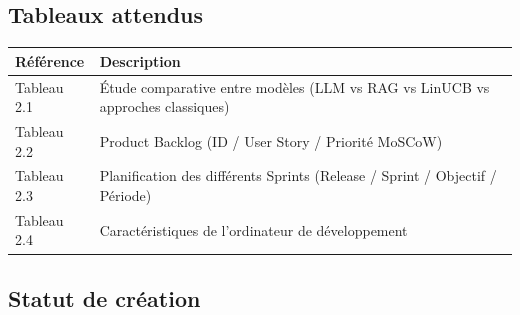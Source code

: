 \documentclass[12pt,a4paper]{article}
\begin{document}
\subsection*{Tableaux attendus}

\begin{longtable}{p{2cm} p{12cm}}
    \textbf{Référence} & \textbf{Description} \\
    \midrule
    \endhead
    
    Tableau 2.1 & Étude comparative entre modèles (LLM vs RAG vs LinUCB vs approches classiques) \\
    Tableau 2.2 & Product Backlog (ID / User Story / Priorité MoSCoW) \\
    Tableau 2.3 & Planification des différents Sprints (Release / Sprint / Objectif / Période) \\
    Tableau 2.4 & Caractéristiques de l'ordinateur de développement \\
    \bottomrule
\end{longtable}

\subsection*{Statut de création}
\end{document}
